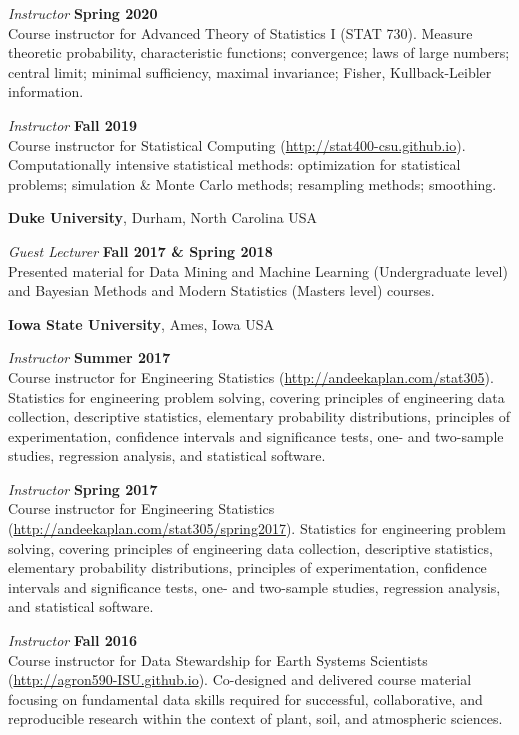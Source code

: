 \documentclass[margin,line]{res}
\begin{document}
\begin{resume}
{\em Instructor} \hfill {\bf Spring 2020}\\
Course instructor for Advanced Theory of Statistics I (STAT 730). Measure theoretic probability, characteristic functions; convergence; laws of large numbers; central limit; minimal sufficiency, maximal invariance; Fisher, Kullback-Leibler information.

{\em Instructor} \hfill {\bf Fall 2019}\\
Course instructor for Statistical Computing (\url{http://stat400-csu.github.io}). Computationally intensive statistical methods: optimization for statistical problems; simulation \& Monte Carlo methods; resampling methods; smoothing.

{\bf Duke University}, Durham, North Carolina USA

{\em Guest Lecturer} \hfill {\bf Fall 2017 \& Spring 2018}\\
Presented material for Data Mining and Machine Learning (Undergraduate level) and Bayesian Methods and Modern Statistics (Masters level) courses.

{\bf Iowa State University}, Ames, Iowa USA

{\em Instructor} \hfill {\bf Summer 2017}\\
Course instructor for Engineering Statistics (\url{http://andeekaplan.com/stat305}). Statistics for engineering problem solving, covering principles of engineering data collection, descriptive statistics, elementary probability distributions, principles of experimentation, confidence intervals and significance tests, one- and two-sample studies, regression analysis, and statistical software.

{\em Instructor} \hfill {\bf Spring 2017}\\
Course instructor for Engineering Statistics (\url{http://andeekaplan.com/stat305/spring2017}). Statistics for engineering problem solving, covering principles of engineering data collection, descriptive statistics, elementary probability distributions, principles of experimentation, confidence intervals and significance tests, one- and two-sample studies, regression analysis, and statistical software.

{\em Instructor} \hfill {\bf Fall 2016}\\
Course instructor for Data Stewardship for Earth Systems Scientists (\url{http://agron590-ISU.github.io}). Co-designed
and delivered course material focusing on fundamental data skills required for successful,
collaborative, and reproducible research within the context of plant, soil, and atmospheric sciences.


\end{resume}
\end{document}
